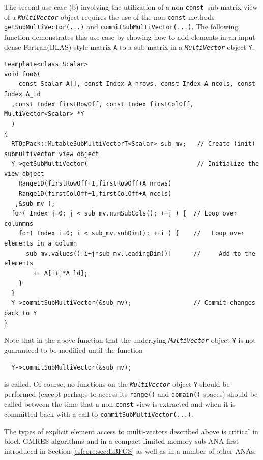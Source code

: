 The second use case (b) involving the utilization of a
non-{}\texttt{const}\ sub-matrix view of a
{}\texttt{\textit{Multi\-Vector}} object requires the use of the
non-{}\texttt{const} methods {}\texttt{get\-Sub\-Multi\-Vector(...)}
and {}\texttt{commit\-Sub\-Multi\-Vector(...)}.  The following
function demonstrates this use case by showing how to add elements in
an input dense Fortran(BLAS) style matrix {}\texttt{A} to a sub-matrix
in a {}\texttt{\textit{Multi\-Vector}} object {}\texttt{Y}.

{\scriptsize\begin{verbatim}
teamplate<class Scalar>
void foo6(
	const Scalar A[], const Index A_nrows, const Index A_ncols, const Index A_ld
  ,const Index firstRowOff, const Index firstColOff, MultiVector<Scalar> *Y
  )
{
  RTOpPack::MutableSubMultiVectorT<Scalar> sub_mv;   // Create (init) submultivector view object
  Y->getSubMultiVector(                              // Initialize the view object
    Range1D(firstRowOff+1,firstRowOff+A_nrows)
    Range1D(firstColOff+1,firstColOff+A_ncols)
   ,&sub_mv );
  for( Index j=0; j < sub_mv.numSubCols(); ++j ) {  // Loop over colunmns
    for( Index i=0; i < sub_mv.subDim(); ++i ) {    //   Loop over elements in a column
      sub_mv.values()[i+j*sub_mv.leadingDim()]      //     Add to the elements
        += A[i+j*A_ld];
    }
  }
  Y->commitSubMultiVector(&sub_mv);                 // Commit changes back to Y
}
\end{verbatim}}

Note that in the above function that the underlying
{}\texttt{\textit{Multi\-Vector}} object {}\texttt{Y} is not
guaranteed to be modified until the function

{\scriptsize\begin{verbatim}
  Y->commitSubMultiVector(&sub_mv);
\end{verbatim}}

{}\noindent{}is called.  Of course, no functions on the
{}\texttt{\textit{Multi\-Vector}} object {}\texttt{Y} should be
performed (except perhaps to access its {}\texttt{range()} and
{}\texttt{domain()} spaces) should be called between the time that a
non-\texttt{const} view is extracted and when it is committed back
with a call to {}\texttt{commit\-Sub\-Multi\-Vector(...)}.

The types of explicit element access to multi-vectors described above
is critical in block GMRES algorithms and in a compact limited memory
sub-ANA first introduced in Section {}\ref{tsfcore:sec:LBFGS} as well
as in a number of other ANAs.

